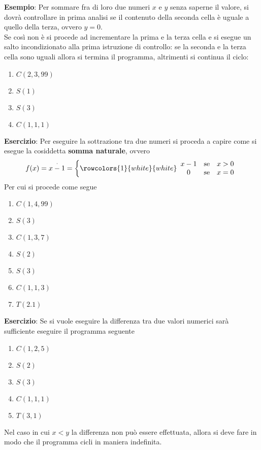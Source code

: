 \documentclass[a4paper]{extarticle}
\begin{document}
\vspace{1em}
\noindent
\textbf{Esempio}: Per sommare fra di loro due numeri \(x\) e \(y\) senza saperne il valore, si dovrà controllare in prima analisi se il contenuto della seconda cella è uguale a quello della terza, ovvero \(y = 0\).\\
Se così non è si procede ad incrementare la prima e la terza cella e si esegue un salto incondizionato alla prima istruzione di controllo: se la seconda e la terza cella sono uguali allora si termina il programma, altrimenti si continua il ciclo:
\begin{enumerate}
    \item \(C(2, 3, 99)\)
    \item \(S(1)\)
    \item \(S(3)\)
    \item \(C(1, 1, 1)\)
\end{enumerate}

\vspace{1em}
\noindent
\textbf{Esercizio}: Per eseguire la sottrazione tra due numeri si proceda a capire come si esegue la cosiddetta \textbf{somma naturale}, ovvero
\[f(x) = x \overset{\cdot}{-} 1 = \left\{
    \rowcolors{1}{white}{white}
    \begin{array}{ccc}
         x - 1 & \text{se} & x > 0\\
         0 & \text{se} & x = 0
    \end{array}
\right.\]
Per cui si procede come segue
\begin{enumerate}
    \item \(C(1, 4, 99)\)
    \item \(S(3)\)
    \item \(C(1, 3, 7)\)
    \item \(S(2)\)
    \item \(S(3)\)
    \item \(C(1, 1, 3)\)
    \item \(T(2. 1)\)
\end{enumerate}

\vspace{1em}
\noindent
\textbf{Esercizio}: Se si vuole eseguire la differenza tra due valori numerici sarà sufficiente eseguire il programma seguente
\begin{enumerate}
    \item \(C(1, 2,5)\)
    \item \(S(2)\)
    \item \(S(3)\)
    \item \(C(1, 1, 1)\)
    \item \(T(3, 1)\)
\end{enumerate}
Nel caso in cui \(x < y\) la differenza non può essere effettuata, allora si deve fare in modo che il programma cicli in maniera indefinita.
\end{document}
